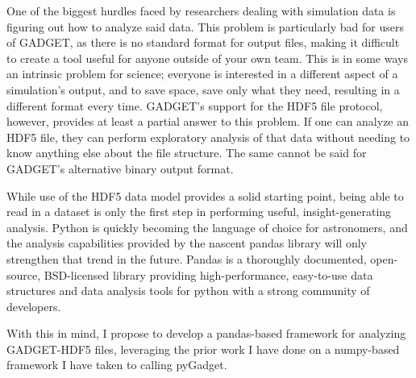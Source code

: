 One of the biggest hurdles faced by researchers dealing with simulation data is figuring out how to analyze said data.  This problem is particularly bad for users of GADGET, as there is no standard format for output files, making it difficult to create a tool useful for anyone outside of your own team.  This is in some ways an intrinsic problem for science; everyone is interested in a different aspect of a simulation’s output, and to save space, save only what they need, resulting in a different format every time.  GADGET’s support for the HDF5 file protocol, however, provides at least a partial answer to this problem.  If one can analyze an HDF5 file, they can perform exploratory analysis of that data without needing to know anything else about the file structure.  The same cannot be said for GADGET’s alternative binary output format.  

While use of the HDF5 data model provides a solid starting point, being able to read in a dataset is only the first step in performing useful, insight-generating analysis.  Python is quickly becoming the language of choice for astronomers, and the analysis capabilities provided by the nascent pandas library will only strengthen that trend in the future.  Pandas is a thoroughly documented, open-source, BSD-licensed library providing high-performance, easy-to-use data structures and data analysis tools for python with a strong community of developers.  

With this in mind, I propose to develop a pandas-based framework for analyzing GADGET-HDF5 files, leveraging the prior work I have done on a numpy-based framework I have taken to calling pyGadget.